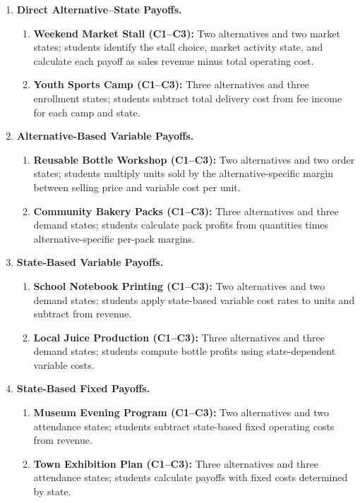 	\begin{enumerate}
		\item \textbf{Direct Alternative--State Payoffs.}
		\begin{enumerate}
			\item \textbf{Weekend Market Stall (C1--C3):} Two alternatives and two market states; students identify the stall choice, market activity state, and calculate each payoff as sales revenue minus total operating cost.
			\item \textbf{Youth Sports Camp (C1--C3):} Three alternatives and three enrollment states; students subtract total delivery cost from fee income for each camp and state.
		\end{enumerate}
		\item \textbf{Alternative-Based Variable Payoffs.}
		\begin{enumerate}
			\item \textbf{Reusable Bottle Workshop (C1--C3):} Two alternatives and two order states; students multiply units sold by the alternative-specific margin between selling price and variable cost per unit.
			\item \textbf{Community Bakery Packs (C1--C3):} Three alternatives and three demand states; students calculate pack profits from quantities times alternative-specific per-pack margins.
		\end{enumerate}
		\item \textbf{State-Based Variable Payoffs.}
		\begin{enumerate}
			\item \textbf{School Notebook Printing (C1--C3):} Two alternatives and two demand states; students apply state-based variable cost rates to units and subtract from revenue.
			\item \textbf{Local Juice Production (C1--C3):} Three alternatives and three demand states; students compute bottle profits using state-dependent variable costs.
		\end{enumerate}
		\item \textbf{State-Based Fixed Payoffs.}
		\begin{enumerate}
			\item \textbf{Museum Evening Program (C1--C3):} Two alternatives and two attendance states; students subtract state-based fixed operating costs from revenue.
			\item \textbf{Town Exhibition Plan (C1--C3):} Three alternatives and three attendance states; students calculate payoffs with fixed costs determined by state.
		\end{enumerate}

\end{enumerate}
